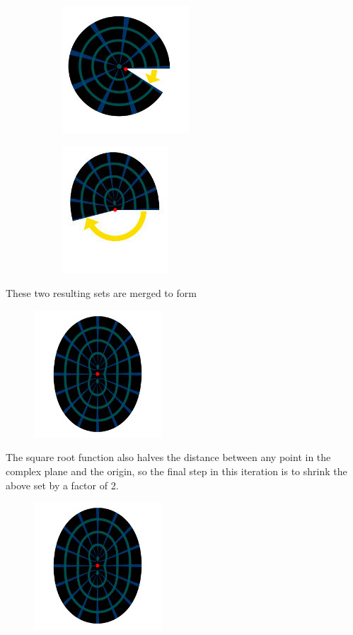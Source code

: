 \documentclass[12pt]{article}
\begin{document}
\begin{figure}[H]
	\centering
	\begin{subfigure}{.5\textwidth}
		\centering
		\includegraphics[width=.4\linewidth,angle=180]{images/julia2}
		\label{fig:sub1}
	\end{subfigure}%
	\begin{subfigure}{.5\textwidth}
		\centering
		\includegraphics[width=.4\linewidth,angle=180]{images/julia3}
		\label{fig:sub2}
	\end{subfigure}
	\label{fig:test}
\end{figure}
These two resulting sets are merged to form
\begin{figure}[H]
	\centering
	\includegraphics[width=0.2\linewidth]{images/julia4}
	\label{fig:rootEx2}
\end{figure}
The square root function also halves the distance between any point in the complex 
plane and the origin, so the final step in this iteration is to shrink the above set by a factor of 2.
\begin{figure}[H]
	\centering
	\includegraphics[width=0.1\linewidth]{images/julia4}
	\label{fig:rootEx2}
\end{figure}
\end{document}
